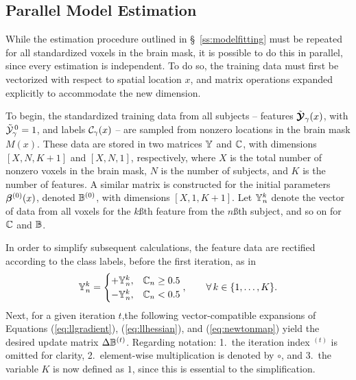 \subsection{Parallel Model Estimation}\label{s:parallelfit}
While the estimation procedure outlined in \S~\ref{ss:modelfitting}
must be repeated for all standardized voxels in the brain mask,
it is possible to do this in parallel, since every estimation is independent.
To do so, the training data must first be vectorized with respect to spatial location $x$,
and matrix operations expanded explicitly to accommodate the new dimension.
\par
To begin, the standardized training data from all subjects
-- features $\tilde{\bm{\mathcal{Y}}}_{\gamma}(x)$, with $\tilde{\mathcal{Y}}_{\gamma}^{\thinspace0}=1$,
and labels $\mathcal{C}_{\gamma}(x)$ --
are sampled from nonzero locations in the brain mask $M(x)$.
These data are stored in two matrices $\mathbb{Y}$ and $\mathbb{C}$,
with dimensions $[X,N,K+1]$ and $[X,N,1]$, respectively, where
$X$ is the total number of nonzero voxels in the brain mask,
$N$ is the number of subjects, and
$K$ is the number of features.
A similar matrix is constructed for the initial parameters $\bm{\beta}^{(0)}(x)$, denoted $\mathbb{B}^{(0)}$,
with dimensions $[X,1,K+1]$.
Let $\mathbb{Y}_n^k$ denote the vector of data
from all voxels for the $k$\ss{th} feature from the $n$\ss{th} subject,
and so on for $\mathbb{C}$ and $\mathbb{B}$.
\par
In order to simplify subsequent calculations,
the feature data are rectified according to the class labels,
before the first iteration, as in
\begin{equation}
  \mathbb{Y}_n^k =
  \begin{cases}
    +\mathbb{Y}_n^k, & \mathbb{C}_n \ge 0.5\\
    -\mathbb{Y}_n^k, & \mathbb{C}_n  <  0.5\\
  \end{cases},\qquad\forall\thinspace k \in \{1,\dots,K\}.
\end{equation}
Next, for a given iteration $t$,the following vector-compatible expansions of Equations
(\ref{eq:llgradient}), (\ref{eq:llhessian}), and (\ref{eq:newtonmap})
yield the desired update matrix $\Delta\mathbb{B}^{(t)}$.
Regarding notation:
1.\ the iteration index ${}^{(t)}$ is omitted for clarity,
2.\ element-wise multiplication is denoted by $\circ$, and
3.\ the variable $K$ is now defined as $1$, since this is essential to the simplification.
\par
